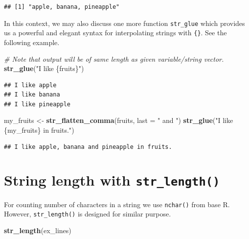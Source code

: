 \documentclass[
]{book}
\newenvironment{Shaded}{\begin{snugshade}}{\end{snugshade}}
\newcommand{\AttributeTok}[1]{\textcolor[rgb]{0.13,0.29,0.53}{#1}}
\newcommand{\CommentTok}[1]{\textcolor[rgb]{0.56,0.35,0.01}{\textit{#1}}}
\newcommand{\FunctionTok}[1]{\textcolor[rgb]{0.13,0.29,0.53}{\textbf{#1}}}
\newcommand{\NormalTok}[1]{#1}
\newcommand{\OtherTok}[1]{\textcolor[rgb]{0.56,0.35,0.01}{#1}}
\newcommand{\StringTok}[1]{\textcolor[rgb]{0.31,0.60,0.02}{#1}}
\begin{document}
\begin{verbatim}
## [1] "apple, banana, pineapple"
\end{verbatim}

In this context, we may also discuss one more function \texttt{str\_glue} which provides us a powerful and elegant syntax for interpolating strings with \texttt{\{\}}. See the following example.

\begin{Shaded}
\begin{Highlighting}[]
\CommentTok{\# Note that output will be of same length as given variable/string vector.}
\FunctionTok{str\_glue}\NormalTok{(}\StringTok{"I like \{fruits\}"}\NormalTok{)}
\end{Highlighting}
\end{Shaded}

\begin{verbatim}
## I like apple
## I like banana
## I like pineapple
\end{verbatim}

\begin{Shaded}
\begin{Highlighting}[]
\NormalTok{my\_fruits }\OtherTok{\textless{}{-}} \FunctionTok{str\_flatten\_comma}\NormalTok{(fruits, }\AttributeTok{last =} \StringTok{" and "}\NormalTok{)}
\FunctionTok{str\_glue}\NormalTok{(}\StringTok{"I like \{my\_fruits\} in fruits."}\NormalTok{)}
\end{Highlighting}
\end{Shaded}

\begin{verbatim}
## I like apple, banana and pineapple in fruits.
\end{verbatim}

\hypertarget{string-length-with-str_length}{%
\section{\texorpdfstring{String length with \texttt{str\_length()}}{String length with str\_length()}}\label{string-length-with-str_length}}

For counting number of characters in a string we use \texttt{nchar()} from base R. However, \texttt{str\_length()} is designed for similar purpose.

\begin{Shaded}
\begin{Highlighting}[]
\FunctionTok{str\_length}\NormalTok{(ex\_lines)}
\end{Highlighting}
\end{Shaded}
\end{document}

